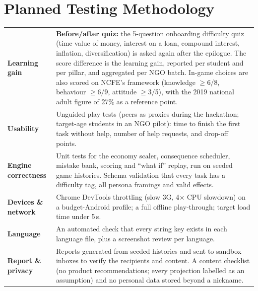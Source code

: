 \documentclass[10pt,a4paper]{article}
\begin{document}
\section{Planned Testing Methodology}
{\small
\begin{tabularx}{\textwidth}{@{}>{\bfseries}p{3.0cm}X@{}}
\toprule
Learning gain & \textbf{Before/after quiz:} the 5-question onboarding difficulty quiz (time value of money, interest on a loan, compound interest, inflation, diversification) is asked again after the epilogue. The score difference is the learning gain, reported per student and per pillar, and aggregated per NGO batch. In-game choices are also scored on NCFE's framework (knowledge $\geq$6/8, behaviour $\geq$6/9, attitude $\geq$3/5), with the 2019 national adult figure of 27\% as a reference point.\\
Usability & Unguided play tests (peers as proxies during the hackathon; target-age students in an NGO pilot): time to finish the first task without help, number of help requests, and drop-off points.\\
Engine correctness & Unit tests for the economy scaler, consequence scheduler, mistake bank, scoring and ``what if'' replay, run on seeded game histories. Schema validation that every task has a difficulty tag, all persona framings and valid effects.\\
Devices \& network & Chrome DevTools throttling (slow 3G, 4$\times$ CPU slowdown) on a budget-Android profile; a full offline play-through; target load time under 5\,s.\\
Language & An automated check that every string key exists in each language file, plus a screenshot review per language.\\
Report \& privacy & Reports generated from seeded histories and sent to sandbox inboxes to verify the recipients and content. A content checklist (no product recommendations; every projection labelled as an assumption) and no personal data stored beyond a nickname.\\
\bottomrule
\end{tabularx}}
\end{document}
